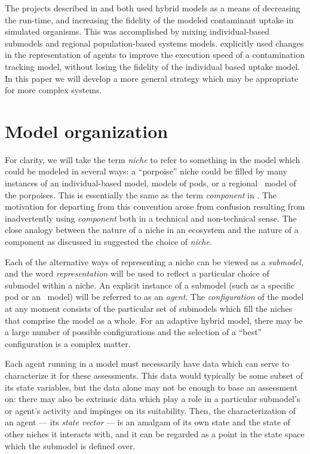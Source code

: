 The projects described in \cite{Little2006nws} and \cite{Fulton2011ningaloo}
both used hybrid models as a means of decreasing the run-time, and
increasing the fidelity of the modeled contaminant uptake in 
simulated organisms. This was accomplished by mixing in\-di\-vidu\-al-based
sub\-models and regional population-based systems
models. \cite{Gray2012adaptive} explicitly used changes in the rep\-re\-sentation
of agents to improve the execution speed of a contamination tracking
model, without losing the fidelity of the in\-di\-vidu\-al based uptake
model. In this paper we will develop a more general strategy which may
be appropriate for more complex systems.


\section{Model organization}

For clarity, we will take the term \emph{niche} to refer to something
in the model which could be modeled in several ways: a ``porpoise''
niche could be filled by many instances of an in\-di\-vidu\-al-based
model, models of pods, or a regional \SD\ model of the porpoises.
This is essentially the same as the term \emph{component} in
\cite{vincenot2011theoretical}. The motivation for departing from this
convention arose from confusion resulting from inadvertently using
\emph{component} both in a technical and non-technical sense.  The
close analogy between the nature of a niche in an ecosystem and the
nature of a component as discussed in \cite{vincenot2011theoretical}
suggested the choice of \emph{niche}. 

Each of the alternative ways of representing a niche can be viewed as
a \emph{sub\-model}, and the word \emph{rep\-re\-sen\-ta\-tion} will
be used to reflect a particular choice of sub\-model within a niche.
An explicit instance of a sub\-model (such as a specific pod or an
\SD\ model) will be referred to as an \emph{agent}.  The
\emph{con\-fig\-ur\-a\-tion} of the model at any moment consists of
the particular set of sub\-models which fill the niches that comprise
the model as a whole. For an adaptive hybrid model, there may be a
large number of possible con\-fig\-ur\-a\-tions and the selection of a
``best'' con\-fig\-ur\-a\-tion is a complex matter.

Each agent running in a model must necessarily have data which can
serve to characterize it for these assessments. This data would
typically be some subset of its state variables, but the data alone
may not be enough to base an assessment on: there may also be
extrinsic data which play a role in a particular sub\-model's or agent's
activity and impinges on its suitability. Then, the characterization
of an agent --- its \emph{state vector} --- is an amalgam of its own
state and the state of other niches it interacts with, and it can be
regarded as a point in the state space which the sub\-model is defined
over. 

